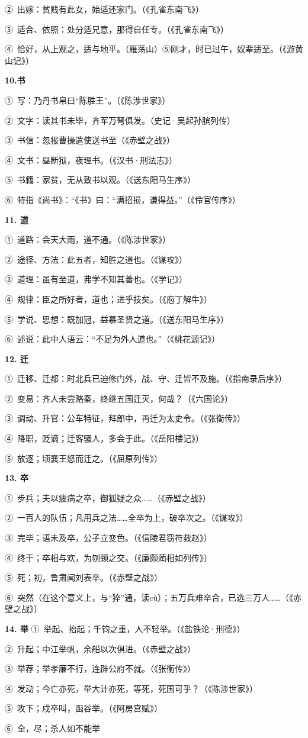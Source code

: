 ②\ 出嫁：贫贱有此女，始适还家门。（《孔雀东南飞》）

③\ 适合、依照：处分适兄意，那得自任专。（《孔雀东南飞》）

④\ 恰好，从上观之，适与地平。（雁荡山）⑤刚才，时已过午，奴辈适至。（《游黄山记》）

\textbf{10.书}

①\ 写：乃丹书帛曰“陈胜王”。（《陈涉世家》）

②\ 文字：读其书未毕，齐军万弩俱发。（史记·吴起孙膑列传）

③\ 书信：忽报曹操遣使送书至（《赤壁之战》）

④\ 文书：昼断狱，夜理书。（《汉书·刑法志》）

⑤\ 书籍：家贫，无从致书以观。（《送东阳马生序》）

⑥\ 特指《尚书》：“《书》曰：“满招损，谦得益。”（《伶官传序》）

\textbf{11. 道}

①\ 道路：会天大雨，道不通。（《陈涉世家》）

②\ 途径、方法：此五者，知胜之道也。（《谋攻》）

③\ 道理：虽有至道，弗学不知其善也。（《学记》）

④\ 规律：臣之所好者，道也；进乎技矣。（《庖丁解牛》）

⑤\ 学说、思想：既加冠，益慕圣贤之道。（《送东阳马生序》）

⑥\ 述说：此中人语云：“不足为外人道也。”（《桃花源记》）

\textbf{12. 迁}

①\ 迁移、迁都：时北兵已迫修门外，战、守、迁皆不及施。（《指南录后序》）

②\ 变易：齐人未尝赂秦，终继五国迁灭，何哉？（《六国论》）

③\ 调动、升官：公车特征，拜郎中，再迁为太史令。（《张衡传》）

④\ 降职，贬谪；迁客骚人，多会于此。（《岳阳楼记》）

⑤\ 放逐；顷襄王怒而迁之。（《屈原列传》）

\textbf{13. 卒}

①\ 步兵；夫以疲病之卒，御狐疑之众……（《赤壁之战》）

②\ 一百人的队伍；凡用兵之法……全卒为上，破卒次之。（《谋攻》）

③\ 完毕；语未及卒，公子立变色。（《信陵君窃符救赵》）

④\ 终于；卒相与欢，为刎颈之交。（《廉颇蔺相如列传》）

⑤\ 死；初，鲁肃闻刘表卒。（《赤壁之战》）

⑥\ 突然（在这个意义上，与“猝”通，读cù）；五万兵难卒合，已选三万人……（《赤壁之战》）

\textbf{14. 举}
①\ 举起、抬起；千钧之重，人不轻举。（《盐铁论·刑德》）

②\ 升起；中江举帆，余船以次俱进。（《赤壁之战》）

③\ 举荐；举孝廉不行，连辟公府不就。（《张衡传》）

④\ 发动；今亡亦死，举大计亦死，等死，死国可乎？（《陈涉世家》）

⑤\ 攻下；戍卒叫，函谷举。（《阿房宫赋》）

⑥\ 全，尽；杀人如不能举